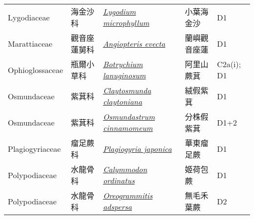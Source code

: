 {\begin{longtable}{L{2.5cm}L{2cm}L{5cm}L{2.5cm}L{3cm}}
    Lygodiaceae & 海金沙科 & \href{http://www.theplantlist.org/tpl1.1/search?q=Lygodium+microphyllum}{\textit{Lygodium microphyllum} } & 小葉海金沙 & D1    \\
    Marattiaceae & 觀音座蓮舅科 & \href{http://www.theplantlist.org/tpl1.1/search?q=Angiopteris+evecta}{\textit{Angiopteris evecta} } & 蘭嶼觀音座蓮 & D1    \\
    Ophioglossaceae & 瓶爾小草科 & \href{http://www.theplantlist.org/tpl1.1/search?q=Botrychium+lanuginosum}{\textit{Botrychium lanuginosum} } & 阿里山蕨萁 & C2a(i); D1    \\
    Osmundaceae & 紫萁科 & \href{http://www.theplantlist.org/tpl1.1/search?q=Claytosmunda+claytoniana}{\textit{Claytosmunda claytoniana} } & 絨假紫萁 & D1    \\
    Osmundaceae & 紫萁科 & \href{http://www.theplantlist.org/tpl1.1/search?q=Osmundastrum+cinnamomeum}{\textit{Osmundastrum cinnamomeum} } & 分株假紫萁 & D1+2    \\
    Plagiogyriaceae & 瘤足蕨科 & \href{http://www.theplantlist.org/tpl1.1/search?q=Plagiogyria+japonica}{\textit{Plagiogyria japonica} } & 華東瘤足蕨 & D1    \\
    Polypodiaceae & 水龍骨科 & \href{http://www.theplantlist.org/tpl1.1/search?q=Calymmodon+ordinatus}{\textit{Calymmodon ordinatus} } & 姬荷包蕨 & D1    \\
    Polypodiaceae & 水龍骨科 & \href{http://www.theplantlist.org/tpl1.1/search?q=Oreogrammitis+adspersa}{\textit{Oreogrammitis adspersa} } & 無毛禾葉蕨 & D2    \\

\end{longtable}}
